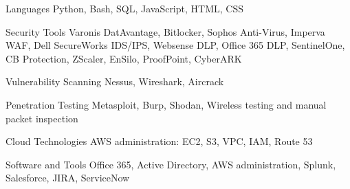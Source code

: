 
\begin{cvskills}
  \cvskill
    {Languages} %
    {Python, Bash, SQL, JavaScript, HTML, CSS} %

  \cvskill
    {Security Tools} %
    {Varonis DatAvantage, Bitlocker, Sophos Anti-Virus, Imperva WAF, Dell SecureWorks IDS/IPS, 
    Websense DLP, Office 365 DLP, SentinelOne, CB Protection, ZScaler, EnSilo, ProofPoint, CyberARK} %

  \cvskill
    {Vulnerability Scanning} %
    {Nessus, Wireshark, Aircrack} %

  \cvskill
    {Penetration Testing} %
    {Metasploit, Burp, Shodan, Wireless testing and manual packet inspection} %

  \cvskill
    {Cloud Technologies} %
    {AWS administration: EC2, S3, VPC, IAM, Route 53} %

  \cvskill
    {Software and Tools} %
    {Office 365, Active Directory, AWS administration, Splunk, Salesforce, JIRA, ServiceNow} %

\end{cvskills}
